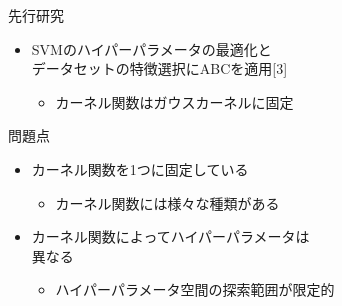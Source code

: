 \documentclass[12pt, cjk, dvipdfmx]{beamer}
\begin{document}
\begin{frame}
\begin{columns}[t]
\begin{column}{0.490\linewidth}
          \begin{mybox}{先行研究}
            \begin{itemize}
            \item SVMのハイパーパラメータの最適化と\\データセットの特徴選択にABCを適用[3]
            \begin{itemize}
              \item カーネル関数はガウスカーネルに固定
            \end{itemize}
            \end{itemize}
          \end{mybox}
          \begin{mybox}{問題点}
            \begin{itemize}
            \item カーネル関数を1つに固定している
             \begin{itemize}
            \item  カーネル関数には様々な種類がある
             \end{itemize}
            \item カーネル関数によってハイパーパラメータは\\異なる
               \begin{itemize}
                  \item ハイパーパラメータ空間の探索範囲が限定的
               \end{itemize}
            \end{itemize}
          \end{mybox}
           

\end{column}
\end{columns}
\end{frame}
\end{document}
